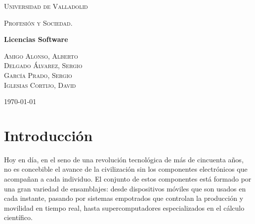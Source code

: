\documentclass[10pt]{article}
\begin{document}
	\begin{titlepage}
      \centering
          {\scshape\LARGE Universidad de Valladolid \par}
          \vspace{1cm}
          {\scshape\Large Profesión y Sociedad.\par}
          \vspace{1.5cm}
          {\huge\bfseries Licencias Software \par}
          \vspace{2cm}
          {\large
          \textsc{Amigo Alonso, Alberto}\\[2mm] %
          \textsc{Delgado Álvarez, Sergio}\\[2mm] %
          \textsc{García Prado, Sergio}\\[2mm] %
          \textsc{Iglesias Cortijo, David}\\[2mm] %

          \vspace{-5mm}
          }

          \vfill
		{\large \today\par}
	\end{titlepage}


	\clearpage
	\tableofcontents


	\clearpage
    \section{Introducción}		
        \paragraph{}
        Hoy en día, en el seno de una revolución tecnológica de más de cincuenta años, no es concebible el avance de la civilización sin los componentes electrónicos que acompañan a cada individuo. El conjunto de estos componentes está formado por una gran variedad de ensamblajes: desde dispositivos móviles que son usados en cada instante, pasando por sistemas empotrados que controlan la producción y movilidad en tiempo real, hasta supercomputadores especializados en el cálculo científico.
        
\end{document}
